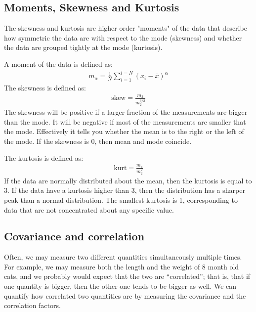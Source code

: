 \subsection{Moments, Skewness and Kurtosis}

The skewness and kurtosis are higher order "moments" of the data that describe how symmetric the data are with respect to the mode (skewness) and whether the data are grouped tightly at the mode (kurtosis).

A moment of the data is defined as:
\begin{align}
 m_\alpha=\frac{1}{N} \sum_{i=1}^{i=N} (x_i-\bar{x})^\alpha 
\end{align}
The skewness is defined as:
\begin{align}
 \text{skew} = \frac{m_3}{m_2^{3/2}} 
\end{align}
The skewness will be positive if a larger fraction of the measurements are bigger than the mode. It will be negative if most of the measurements are smaller that the mode. Effectively it tells you whether the mean is to the right or the left of the mode. If the skewness is 0, then mean and mode coincide.

The kurtosis is defined as:
\begin{align}
  \text{kurt}  =\frac{m_4}{m_2^{2}} 
\end{align}
If the data are normally distributed about the mean, then the kurtosis is equal to 3. If the data have a kurtosis higher than 3, then the distribution has a sharper peak than a normal distribution. The smallest kurtosis is 1, corresponding to data that are not concentrated about any specific value.

\subsection{Covariance and correlation}
Often, we may measure two different quantities simultaneously multiple times. For example, we may measure both the length and the weight of 8 month old cats, and we probably would expect that the two are ``correlated''; that is, that if one quantity is bigger, then the other one tends to be bigger as well. We can quantify how correlated two quantities are by measuring the covariance and the correlation factors. 

